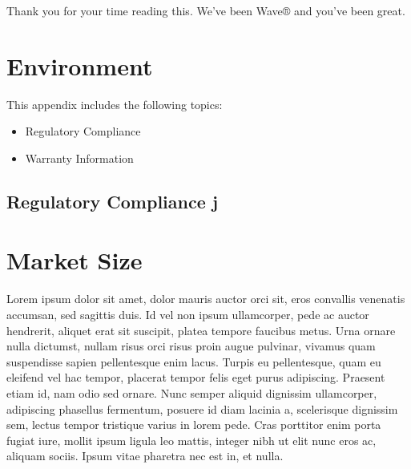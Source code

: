 \documentclass[letterpaper,10pt,openany,oneside,english]{sphinxmanual}
\begin{document}
Thank you for your time reading this.
We’ve been Wave® and you’ve been great.


\section{Environment}
\label{\detokenize{environment:environment}}\label{\detokenize{environment::doc}}
This appendix includes the following topics:
\begin{itemize}
\item {} 
Regulatory Compliance

\item {} 
Warranty Information

\end{itemize}


\subsection{Regulatory Compliance j}
\label{\detokenize{environment:regulatory-compliance-j}}

\section{Market Size}
\label{\detokenize{marketsize:market-size}}\label{\detokenize{marketsize::doc}}
Lorem ipsum dolor sit amet, dolor mauris auctor orci sit, eros convallis venenatis accumsan, sed sagittis duis. Id vel non ipsum ullamcorper, pede ac auctor hendrerit, aliquet erat sit suscipit, platea tempore faucibus metus. Urna ornare nulla dictumst, nullam risus orci risus proin augue pulvinar, vivamus quam suspendisse sapien pellentesque enim lacus. Turpis eu pellentesque, quam eu eleifend vel hac tempor, placerat tempor felis eget purus adipiscing. Praesent etiam id, nam odio sed ornare. Nunc semper aliquid dignissim ullamcorper, adipiscing phasellus fermentum, posuere id diam lacinia a, scelerisque dignissim sem, lectus tempor tristique varius in lorem pede. Cras porttitor enim porta fugiat iure, mollit ipsum ligula leo mattis, integer nibh ut elit nunc eros ac, aliquam sociis. Ipsum vitae pharetra nec est in, et nulla.
\end{document}
